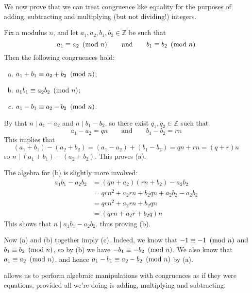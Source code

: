 We now prove that we can treat congruence like equality for the purposes of adding, subtracting and multiplying (but not dividing!) integers.

\begin{theorem}\label{thmModularArithmetic}
Fix a modulus $n$, and let $a_1,a_2,b_1,b_2 \in \mathbb{Z}$ be such that
\[ a_1 \equiv a_2 ~\left(\text{mod}~n\right) \qquad \text{and} \qquad b_1 \equiv b_2 ~\left(\text{mod}~n\right) \]
Then the following congruences hold:
\begin{enumerate}[(a)]
\item $a_1+b_1 \equiv a_2+b_2 ~\left(\text{mod}~n\right)$;
\item $a_1b_1 \equiv a_2b_2 ~\left(\text{mod}~n\right)$;
\item $a_1-b_1 \equiv a_2-b_2 ~\left(\text{mod}~n\right)$.
\end{enumerate}
\end{theorem}
\begin{cproof} By  that $n \mid a_1-a_2$ and $n \mid b_1-b_2$, so there exist $q_1,q_2 \in \mathbb{Z}$ such that
\[ a_1-a_2 = qn \qquad \text{and} \qquad b_1-b_2=rn \]
This implies that
\[ (a_1+b_1)-(a_2+b_2) = (a_1-a_2)+(b_1-b_2) = qn+rn = (q+r)n \]
so $n \mid (a_1+b_1)-(a_2+b_2)$. This proves (a).

The algebra for (b) is slightly more involved:
\begin{align*}
a_1b_1-a_2b_2 &= (qn+a_2)(rn+b_2) - a_2b_2 \\
&= qrn^2 + a_2rn + b_2qn + a_2b_2 - a_2b_2 \\
&= qrn^2 + a_2rn + b_2qn \\
&= (qrn + a_2r + b_2q)n
\end{align*}
This shows that $n \mid a_1b_1 - a_2b_2$, thus proving (b).

Now (a) and (b) together imply (c). Indeed, we know that $-1 \equiv -1 ~\left(\text{mod}~n\right)$ and $b_1 \equiv b_2 ~\left(\text{mod}~n\right)$, so by (b) we have $-b_1 \equiv -b_2 ~\left(\text{mod}~n\right)$. We also know that $a_1 \equiv a_2 ~\left(\text{mod}~n\right)$, and hence $a_1-b_1 \equiv a_2-b_2 ~\left(\text{mod}~n\right)$ by (a).
\end{cproof}

 allows us to perform algebraic manipulations with congruences as if they were equations, provided all we're doing is adding, multiplying and subtracting.

